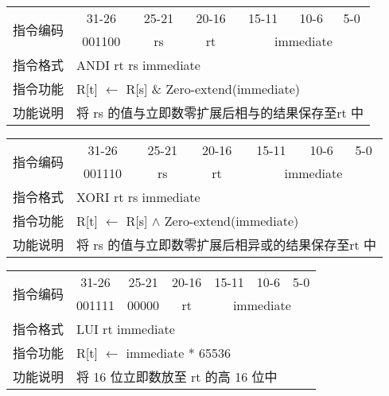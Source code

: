 	\begin{table}[!hbp]
		\centering
		\begin{tabular}{|c|c|c|c|c|c|c|}
		\hline
		\multirow{2}{*}{指令编码} & 31-26&25-21 & 20-16&15-11 &10-6 &5-0\\
		\cline{2-7} & 001100 & rs & rt & \multicolumn{3}{|c|}{immediate} \\
		\hline
		指令格式&\multicolumn{6}{|l|}{ANDI rt rs immediate}\\
		\hline		
		指令功能&\multicolumn{6}{|l|}{R[t] $\leftarrow$  R[s] \& Zero-extend(immediate)}\\
		\hline		
		功能说明&\multicolumn{6}{|l|}{将 rs 的值与立即数零扩展后相与的结果保存至rt 中}\\
		\hline
		\end{tabular}
	\end{table}
	\begin{table}[!hbp]
		\centering
		\begin{tabular}{|c|c|c|c|c|c|c|}
		\hline
		\multirow{2}{*}{指令编码} & 31-26&25-21 & 20-16&15-11 &10-6 &5-0\\
		\cline{2-7} & 001110 & rs & rt & \multicolumn{3}{|c|}{immediate} \\
		\hline
		指令格式&\multicolumn{6}{|l|}{XORI rt rs immediate}\\
		\hline		
		指令功能&\multicolumn{6}{|l|}{R[t] $\leftarrow$  R[s] $\land$ Zero-extend(immediate)}\\
		\hline		
		功能说明&\multicolumn{6}{|l|}{将 rs 的值与立即数零扩展后相异或的结果保存至rt 中}\\
		\hline
		\end{tabular}
	\end{table}
	\begin{table}[!hbp]
		\centering
		\begin{tabular}{|c|c|c|c|c|c|c|}
		\hline
		\multirow{2}{*}{指令编码} & 31-26&25-21 & 20-16&15-11 &10-6 &5-0\\
		\cline{2-7} & 001111 & 00000 & rt & \multicolumn{3}{|c|}{immediate} \\
		\hline
		指令格式&\multicolumn{6}{|l|}{LUI rt immediate}\\
		\hline		
		指令功能&\multicolumn{6}{|l|}{R[t] $\leftarrow$   immediate * 65536}\\
		\hline		
		功能说明&\multicolumn{6}{|l|}{将 16 位立即数放至 rt 的高 16 位中}\\
		\hline
		\end{tabular}
	\end{table}

